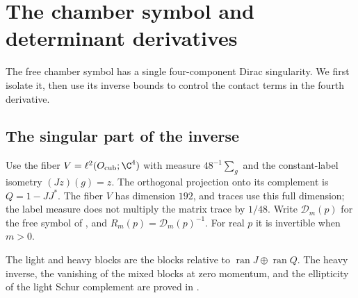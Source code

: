 \documentclass[11pt,letterpaper,reqno]{amsart}
\begin{document}
\section{The chamber symbol and determinant derivatives}\label{subsec:response-bloch}\label{sec:free-response}

The free chamber symbol has a single four-component Dirac singularity.
We first isolate it, then use its inverse bounds to control the contact
terms in the fourth derivative.

\subsection{The singular part of the inverse}

Use the fiber $V=\ell^2(O_{\mathrm{cub}};\C^4)$ with measure
$48^{-1}\sum_g$ and the constant-label isometry $(Jz)(g)=z$.
The orthogonal projection onto its complement is $Q=1-JJ^*$.
The fiber $V$ has dimension $192$, and traces use this full dimension;
the label measure does not multiply the matrix trace by
$1/48$. Write $\mathcal D_m(p)$ for the free symbol of
\cite[\S2.2]{FermionBlock}, and $R_m(p)=\mathcal D_m(p)^{-1}$.
For real $p$ it is invertible when $m>0$.

The light and heavy blocks are the blocks relative to
$\operatorname{ran}J\oplus\operatorname{ran}Q$. The heavy inverse,
the vanishing of the mixed blocks at zero momentum, and the
ellipticity of the light Schur complement are proved in
\cite[Proposition~2.2]{FermionBlock}.
\end{document}
